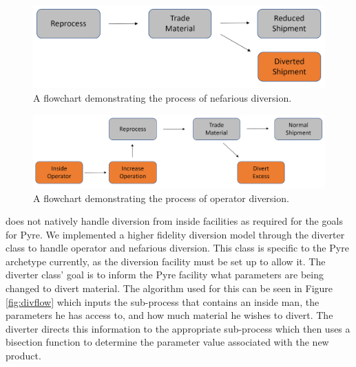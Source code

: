 \FloatBarrier

\begin{figure}[h]
	\centering
	\includegraphics[width=0.8\linewidth]{images/nef-diversion}
	\caption{A flowchart demonstrating the process of nefarious diversion.}
	\label{fig:nef-divert}
\end{figure}

\begin{figure}[h]
	\centering
	\includegraphics[width=0.8\linewidth]{images/op-diversion}
	\caption{A flowchart demonstrating the process of operator diversion.}
	\label{fig:op-divert}
\end{figure}

\Cyclus does not natively handle diversion from inside facilities as required for the goals for Pyre. We implemented a higher fidelity diversion model through the
diverter class to handle operator and nefarious diversion. This class is specific to the Pyre archetype currently, as the diversion facility must be set up to allow it.
The diverter class' goal is to inform the Pyre facility what parameters are being changed to divert material. The algorithm used for this can be seen in Figure \ref{fig:divflow}
which inputs the sub-process that contains an inside man, the parameters he has access to, and how much material he wishes to divert. The diverter directs this information to the
appropriate sub-process which then uses a bisection function to determine the parameter value associated with the new product.

\FloatBarrier

